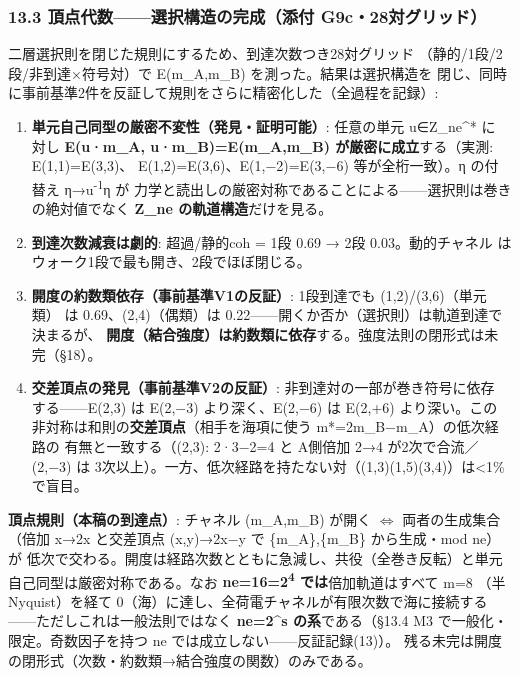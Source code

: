 \documentclass[
]{ltjarticle}
\providecommand{\tightlist}{%
  \setlength{\itemsep}{0pt}\setlength{\parskip}{0pt}}
\begin{document}
\subsubsection{13.3 頂点代数------選択構造の完成（添付
G9c・28対グリッド）}\label{ux9802ux70b9ux4ee3ux6570ux9078ux629eux69cbux9020ux306eux5b8cux6210ux6dfbux4ed8-g9c28ux5bfeux30b0ux30eaux30c3ux30c9}

二層選択則を閉じた規則にするため、到達次数つき28対グリッド
（静的/1段/2段/非到達×符号対）で E(m\_A,m\_B) を測った。結果は選択構造を
閉じ、同時に事前基準2件を反証して規則をさらに精密化した（全過程を記録）:

\begin{enumerate}
\def\labelenumi{\arabic{enumi}.}
\tightlist
\item
  \textbf{単元自己同型の厳密不変性（発見・証明可能）}: 任意の単元
  u∈Z\_ne\^{}* に 対し \textbf{E(u·m\_A, u·m\_B)=E(m\_A,m\_B)
  が厳密に成立}する（実測: E(1,1)=E(3,3)、
  E(1,2)=E(3,6)、E(1,−2)=E(3,−6) 等が全桁一致）。η の付替え
  η→u\textsuperscript{-1}η が
  力学と読出しの厳密対称であることによる------選択則は巻きの絶対値でなく
  \textbf{Z\_ne の軌道構造}だけを見る。
\item
  \textbf{到達次数減衰は劇的}: 超過/静的coh = 1段 0.69 → 2段
  0.03。動的チャネル はウォーク1段で最も開き、2段でほぼ閉じる。
\item
  \textbf{開度の約数類依存（事前基準V1の反証）}: 1段到達でも
  (1,2)/(3,6)（単元類） は 0.69、(2,4)（偶類）は
  0.22------開くか否か（選択則）は軌道到達で決まるが、
  \textbf{開度（結合強度）は約数類に依存}する。強度法則の閉形式は未完（§18）。
\item
  \textbf{交差頂点の発見（事前基準V2の反証）}:
  非到達対の一部が巻き符号に依存 する------E(2,3) は E(2,−3)
  より深く、E(2,−6) は E(2,+6) より深い。この
  非対称は和則の\textbf{交差頂点}（相手を海項に使う
  m*=2m\_B−m\_A）の低次経路の 有無と一致する（(2,3): 2·3−2=4 と A側倍加
  2→4 が2次で合流／(2,−3) は
  3次以上）。一方、低次経路を持たない対（(1,3)(1,5)(3,4)）は\textless1\%で盲目。
\end{enumerate}

\textbf{頂点規則（本稿の到達点）}: チャネル (m\_A,m\_B) が開く
\(\Leftrightarrow\) 両者の生成集合 （倍加 x→2x と交差頂点 (x,y)→2x−y で
\{m\_A\},\{m\_B\} から生成・mod ne）が
低次で交わる。開度は経路次数とともに急減し、共役（全巻き反転）と単元
自己同型は厳密対称である。なお \textbf{ne=16=2\textsuperscript{4}
では}倍加軌道はすべて m=8 （半Nyquist）を経て
0（海）に達し、全荷電チャネルが有限次数で海に接続する
------ただしこれは一般法則ではなく \textbf{ne=2\^{}s の系}である（§13.4
M3 で一般化・ 限定。奇数因子を持つ ne
では成立しない------反証記録(13)）。
残る未完は開度の閉形式（次数・約数類→結合強度の関数）のみである。
\end{document}
